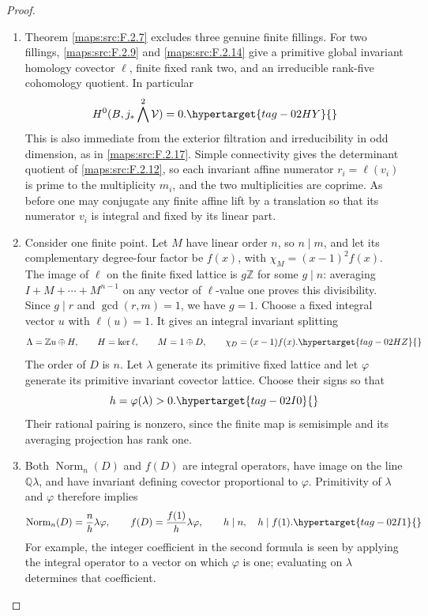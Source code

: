 \documentclass[11pt,a4paper]{article}
\numberwithin{equation}{section}
\theoremstyle{definition}
\begin{document}
\begin{proof}
\begin{enumerate}[label=\arabic*.]
\item Theorem \ref{maps:src:F.2.7} excludes three genuine finite fillings.
For two fillings, \ref{maps:src:F.2.9} and \ref{maps:src:F.2.14} give a primitive global
invariant homology covector $\ell$, finite fixed rank two,
and an irreducible rank-five cohomology quotient.
In particular
\begin{equation}
 H^0(B,j_*\bigwedge^2\mathcal V)=0.
 \hypertarget{tag-02HY}{}\label{maps:eq:F.S2}
\end{equation}
This is also immediate from the exterior filtration and
irreducibility in odd dimension, as in \ref{maps:src:F.2.17}.
Simple connectivity gives the determinant quotient of
\ref{maps:src:F.2.12}, so each invariant affine numerator $r_i=\ell(v_i)$
is prime to the multiplicity $m_i$, and the two
multiplicities are coprime.
As before one may conjugate any finite affine lift by a
translation so that its numerator $v_i$ is integral and
fixed by its linear part.

\item Consider one finite point.  Let $M$ have linear order $n$,
so $n\mid m$, and let its complementary degree-four factor
be $f(x)$, with
$\chi_M=(x-1)^2f(x)$.
The image of $\ell$ on the finite fixed lattice is $g\mathbb Z$
for some $g\mid n$: averaging $I+M+\cdots+M^{n-1}$ on
any vector of $\ell$-value one proves this divisibility.
Since $g\mid r$ and $\gcd(r,m)=1$, we have $g=1$.
Choose a fixed integral vector $u$ with $\ell(u)=1$.
It gives an integral invariant splitting
\begin{equation}
 \Lambda=\mathbb Zu\oplus H,
 \qquad H=\ker\ell,\qquad M=1\oplus D,
 \qquad\chi_D=(x-1)f(x).
 \hypertarget{tag-02HZ}{}\label{maps:eq:F.S3}
\end{equation}
The order of $D$ is $n$.
Let $\lambda$ generate its primitive fixed lattice and
let $\varphi$ generate its primitive invariant covector
lattice.  Choose their signs so that
\begin{equation}
 h=\varphi(\lambda)>0.
 \hypertarget{tag-02I0}{}\label{maps:eq:F.S4}
\end{equation}
Their rational pairing is nonzero, since the finite map
is semisimple and its averaging projection has rank one.

\item Both $\operatorname{Norm}_n(D)$ and $f(D)$ are integral
operators, have image on the line $\mathbb Q\lambda$,
and have invariant defining covector proportional to
$\varphi$.  Primitivity of $\lambda$ and $\varphi$
therefore implies
\begin{equation}
 \operatorname{Norm}_n(D)=\frac n h\lambda\varphi,
 \qquad
 f(D)=\frac{f(1)}h\lambda\varphi,
 \qquad h\mid n,\quad h\mid f(1).
 \hypertarget{tag-02I1}{}\label{maps:eq:F.S5}
\end{equation}
For example, the integer coefficient in the second formula
is seen by applying the integral operator to a vector on
which $\varphi$ is one; evaluating on $\lambda$ determines
that coefficient.  


\end{enumerate}
\end{proof}
\end{document}
